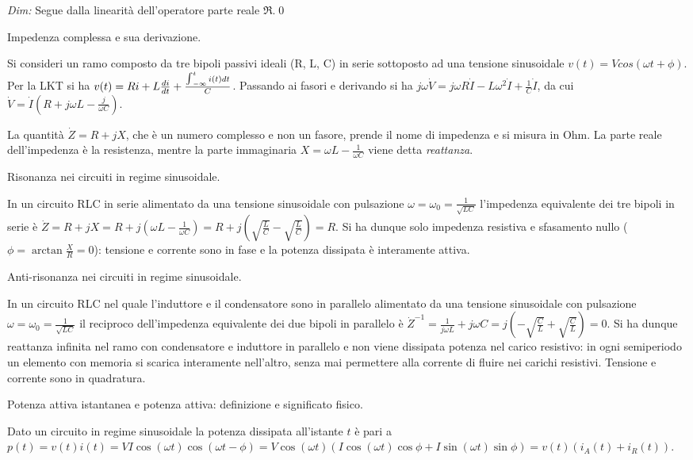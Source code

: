 \documentclass[answers, a4paper,12pt]{exam}
\newcommand{\bigint}{\mathop{\mathlarger{\int}}}
\begin{document}
\begin{questions}
\begin{solution}
\begin{itemize}
			\textit{Dim:} Segue dalla linearità dell'operatore parte reale $\Re$.\qed
		\end{itemize}
	\end{solution}
		\pagebreak
	\question
	Impedenza complessa e sua derivazione.
	\begin{solution}
		Si consideri un ramo composto da tre bipoli passivi ideali (R, L, C) in serie sottoposto ad una tensione sinusoidale $v(t) = V cos (\omega t + \phi)$. Per la LKT si ha $v(t) = Ri + L \frac{di}{dt} + \frac{\bigint_{-\infty}^t i(t) dt}{C}$. Passando ai fasori e derivando si ha $j \omega \dot{V} = j \omega R \dot{I} - L \omega^2 \dot{I} + \frac{1}{C} \dot{I}$, da cui $\dot{V} = \dot{I} (R + j \omega L - \frac{j}{\omega C})$. 
		
		La quantità $\dot{Z} = R + jX$, che è un numero complesso e non un fasore, prende il nome di impedenza e si misura in Ohm. La parte reale dell'impedenza è la resistenza, mentre la parte immaginaria $X = \omega L - \frac{1}{\omega C}$ viene detta \textit{reattanza}.
\end{solution}
	\question
Risonanza nei circuiti in regime sinusoidale.
\begin{solution}
	In un circuito RLC in serie alimentato da una tensione sinusoidale con pulsazione $\omega = \omega_0 = \frac{1}{\sqrt{LC}}$ l'impedenza equivalente dei tre bipoli in serie è $\dot{Z} = R + j X = R + j(\omega L - \frac{1}{\omega C}) = R + j (\sqrt{\frac{L}{C}} - \sqrt{\frac{L}{C}}) = R$. Si ha dunque solo impedenza resistiva e sfasamento nullo ($\phi = \arctan {\frac{X}{R}} = 0$): tensione e corrente sono in fase e la potenza dissipata è interamente attiva. 
\end{solution}
	\question
	Anti-risonanza nei circuiti in regime sinusoidale.
	\begin{solution}
			In un circuito RLC nel quale l'induttore e il condensatore sono in parallelo alimentato da una tensione sinusoidale con pulsazione $\omega = \omega_0 = \frac{1}{\sqrt{LC}}$ il reciproco dell'impedenza equivalente dei due bipoli in parallelo è $\dot{Z}^{-1} = \frac{1}{j \omega L} + j \omega C = j (-\sqrt{\frac{C}{L}} + \sqrt{\frac{C}{L}}) = 0$. Si ha dunque reattanza infinita nel ramo con condensatore e induttore in parallelo e non viene dissipata potenza nel carico resistivo: in ogni semiperiodo un elemento con memoria si scarica interamente nell'altro, senza mai permettere alla corrente di fluire nei carichi resistivi. Tensione e corrente sono in quadratura.
	\end{solution}
	\question
	Potenza attiva istantanea e potenza attiva: definizione e significato fisico.
	\begin{solution}
		Dato un circuito in regime sinusoidale la potenza dissipata all'istante $t$ è pari a $p(t) = v(t) i(t) = V I \cos(\omega t) \cos(\omega t - \phi) = V \cos (\omega t)  (I \cos(\omega t) \cos \phi +  I \sin(\omega t) \sin \phi) = v(t) (i_A (t) + i_R(t))$. 
		

\end{solution}
\end{questions}
\end{document}
